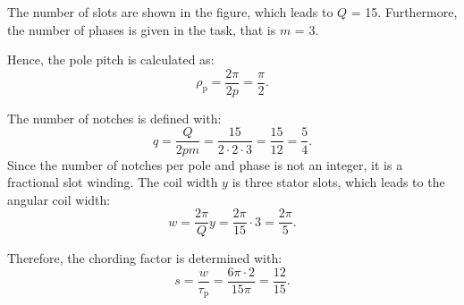 \begin{solutionblock}
    The number of slots are shown in the figure, which leads to $Q$ = 15. Furthermore, the number of phases is given in the task, that is $m$ = 3.

    Hence, the pole pitch is calculated as:
    \begin{equation}
        \rho_{\mathrm{p}} = \frac{2\pi}{2p}
        = \frac{\pi}{2}.
    \end{equation}

    The number of notches is defined with:
    \begin{equation}
        q = \frac{Q}{2pm} = \frac{15}{2\cdot 2 \cdot 3}
        = \frac{15}{12} = \frac{5}{4}.
    \end{equation}
    Since the number of notches per pole and phase is not an integer, it is a fractional slot winding.
    The coil width $y$ is three stator slots, which leads to the angular coil width:
    \begin{equation}
        w = \frac{2\pi}{Q}y
        = \frac{2\pi}{15} \cdot 3
        = \frac{2\pi}{5}.
    \end{equation}

    Therefore, the chording factor is determined with:
    \begin{equation}
        s = \frac{w}{\tau_{\mathrm{p}}}
        = \frac{6\pi \cdot 2}{15 \pi}
        =\frac{12}{15}.
    \end{equation}

\end{solutionblock}


